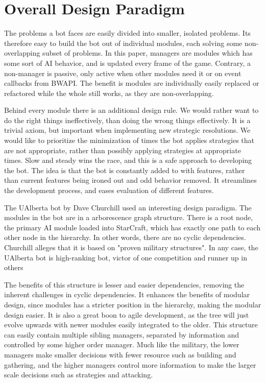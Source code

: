\section{Overall Design Paradigm}
The problems a bot faces are easily divided into smaller, isolated problems. Its therefore easy to build the bot out of individual modules, each solving some non-overlapping subset of problems. In this paper, managers are modules which has some sort of AI behavior, and is updated every frame of the game. Contrary, a non-manager is passive, only active when other modules need it or on event callbacks from BWAPI. The benefit is modules are individually easily replaced or refactored while the whole still works, as they are non-overlapping.

Behind every module there is an additional design rule. We would rather want to do the right things ineffectively, than doing the wrong things effectively. It is a trivial axiom, but important when implementing new strategic resolutions. We would like to prioritize the minimization of times the bot applies strategies that are not appropriate, rather than possibly applying strategies at appropriate times. Slow and steady wins the race, and this is a safe approach to developing the bot. The idea is that the bot is constantly added to with features, rather than current features being ironed out and odd behavior removed. It streamlines the development process, and eases evaluation of different features.

The UAlberta bot by Dave Churchill used an interesting design paradigm. The modules in the bot are in a arborescence graph structure. There is a root node, the primary AI module loaded into StarCraft, which has exactly one path to each other node in the hierarchy. In other words, there are no cyclic dependencies. Churchill alleges that it is based on "proven military structures". In any case, the UAlberta bot is high-ranking bot, victor of one competition and runner up in others

The benefits of this structure is lesser and easier dependencies, removing the inherent challenges in cyclic dependencies. It enhances the benefits of modular design, since modules has a stricter position in the hierarchy, making the modular design easier. It is also a great boon to agile development, as the tree will just evolve upwards with newer modules easily integrated to the older. This structure can easily contain multiple sibling managers, separated by information and controlled by some higher order manager. Much like the military, the lower managers make smaller decisions with fewer resource such as building and gathering, and the higher managers control more information to make the larger scale decisions such as strategies and attacking.

